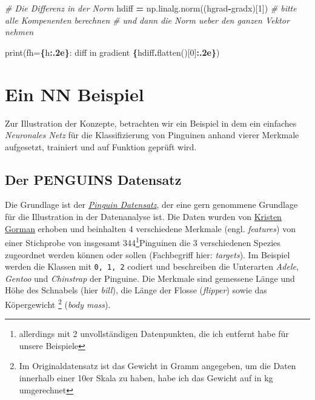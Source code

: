 \documentclass[
]{book}
\newenvironment{Shaded}{\begin{snugshade}}{\end{snugshade}}
\newcommand{\BuiltInTok}[1]{#1}
\newcommand{\CommentTok}[1]{\textcolor[rgb]{0.56,0.35,0.01}{\textit{#1}}}
\newcommand{\DecValTok}[1]{\textcolor[rgb]{0.00,0.00,0.81}{#1}}
\newcommand{\NormalTok}[1]{#1}
\newcommand{\OperatorTok}[1]{\textcolor[rgb]{0.81,0.36,0.00}{\textbf{#1}}}
\newcommand{\SpecialCharTok}[1]{\textcolor[rgb]{0.81,0.36,0.00}{\textbf{#1}}}
\newcommand{\SpecialStringTok}[1]{\textcolor[rgb]{0.31,0.60,0.02}{#1}}
\theoremstyle{definition}
\theoremstyle{definition}
\theoremstyle{definition}
\theoremstyle{definition}
\theoremstyle{remark}
\begin{document}
\begin{Shaded}
\begin{Highlighting}[]
\CommentTok{\# Die Differenz in der Norm}
\NormalTok{hdiff }\OperatorTok{=}\NormalTok{ np.linalg.norm((hgrad}\OperatorTok{{-}}\NormalTok{gradx)[}\DecValTok{1}\NormalTok{])}
\CommentTok{\# bitte alle Kompenenten berechnen}
\CommentTok{\# und dann die Norm ueber den ganzen Vektor nehmen}

\BuiltInTok{print}\NormalTok{(}\SpecialStringTok{f\textquotesingle{}h=}\SpecialCharTok{\{}\NormalTok{h}\SpecialCharTok{:.2e\}}\SpecialStringTok{: diff in gradient }\SpecialCharTok{\{}\NormalTok{hdiff}\SpecialCharTok{.}\NormalTok{flatten()[}\DecValTok{0}\NormalTok{]}\SpecialCharTok{:.2e\}}\SpecialStringTok{\textquotesingle{}}\NormalTok{)}
\end{Highlighting}
\end{Shaded}

\hypertarget{ein-nn-beispiel}{%
\chapter{Ein NN Beispiel}\label{ein-nn-beispiel}}

Zur Illustration der Konzepte, betrachten wir ein Beispiel in dem ein einfaches
\emph{Neuronales Netz} für die Klassifizierung von Pinguinen anhand vierer
Merkmale aufgesetzt, trainiert und auf Funktion geprüft wird.

\hypertarget{der-penguins-datensatz}{%
\section{Der PENGUINS Datensatz}\label{der-penguins-datensatz}}

Die Grundlage ist der \href{https://allisonhorst.github.io/palmerpenguins/}{\emph{Pinguin Datensatz}}, der eine gern genommene Grundlage für die Illustration in der Datenanalyse ist. Die Daten wurden von \href{https://www.uaf.edu/cfos/people/faculty/detail/kristen-gorman.php}{Kristen Gorman} erhoben und beinhalten 4 verschiedene Merkmale (engl. \emph{features}) von einer Stichprobe von insgesamt 344\footnote{allerdings mit 2 unvollständigen Datenpunkten, die ich entfernt habe für unsere Beispiele}Pinguinen die 3 verschiedenen Spezies zugeordnet werden können oder sollen (Fachbegriff hier: \emph{targets}). Im Beispiel werden die Klassen mit \texttt{0,\ 1,\ 2} codiert und beschreiben die Unterarten \emph{Adele}, \emph{Gentoo} und \emph{Chinstrap} der Pinguine. Die Merkmale sind gemessene Länge und Höhe des Schnabels (hier \emph{bill}), die Länge der Flosse (\emph{flipper}) sowie das Köpergewicht \footnote{Im Originaldatensatz ist das Gewicht in Gramm angegeben, um die Daten innerhalb einer 10er Skala zu haben, habe ich das Gewicht auf in kg umgerechnet}
(\emph{body mass}).
\end{document}
